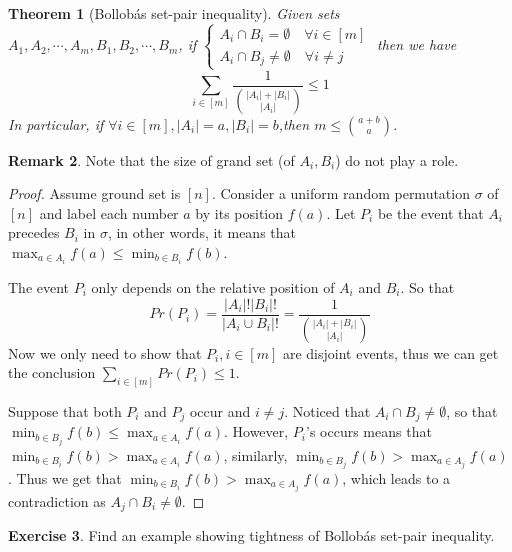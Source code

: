 \documentclass{article}
\newtheorem{theorem}{Theorem}[section]
\theoremstyle{definition}
\newtheorem{remark}[theorem]{Remark}
\newtheorem{exercise}[theorem]{Exercise}
\begin{document}
\begin{theorem}[Bollob\'as set-pair inequality\cite{Bollobassetpair}]
    Given sets $A_1,A_2,\cdots,A_m,B_1,B_2,\cdots,B_m$, if $\left\{\begin{matrix} A_i\cap B_i =\emptyset \quad \forall i\in \left [ m \right ] 
 \\A_i \cap B_j \neq \emptyset \quad \forall i \neq j

\end{matrix}\right.$
then we have $$\sum _{i\in \left [ m \right ] }\frac{1}{\binom{\left | A_i \right |+\left | B_i \right |  }{\left | A_i \right | } } \le 1$$
In particular, if $\forall i \in \left [ m \right ], \left | A_i \right |=a,\left | B_i \right |=b$,then $m \le \binom{a+b}{a}$. 
\end{theorem}

\begin{remark}
    Note that the size of grand set (of $A_i,B_i$) do not play a role.
\end{remark}

\begin{proof}
    Assume ground set is $\left [ n \right ]$. Consider a uniform random permutation $\sigma$ of $\left [ n \right ]$ and label each number $a$ by its position $f(a)$. Let $P_i$ be the event that $A_i$ precedes $B_i$ in $\sigma$, in other words, it means that $\max_{a \in A_i} f(a) \le \min_{b \in B_i} f(b) $. 

    The event $P_i$ only depends on the relative position of $A_i$ and $B_i$. So that $$Pr(P_i)=\frac{\left | A_i \right |!   \left | B_i \right |!  }{\left | A_i \cup B_i \right |! }
=\frac{1}{\binom{\left | A_i \right |+ \left | B_i \right |}{\left | A_i \right |} } $$
    Now we only need to show that $P_i,i\in \left [ m \right ]$ are disjoint events, thus we can get the conclusion $\sum_{i\in \left [ m \right ]}Pr(P_i) \le 1$.

    Suppose that both $P_i$ and $P_j$ occur and $i \neq j$. Noticed that $A_i \cap B_j \neq \emptyset$, so that $\min_{b\in B_j}f(b) \le \max_{a\in A_i}f(a)$. However, $P_i$'s occurs means that $\min_{b\in B_i}f(b) > \max_{a\in A_i}f(a)$, similarly, $\min_{b\in B_j}f(b) > \max_{a\in A_j}f(a)$. Thus we get that $\min_{b\in B_i}f(b) > \max_{a\in A_j}f(a)$, which leads to a contradiction as $A_j \cap B_i \neq \emptyset$.
\end{proof}

\begin{exercise}
    Find an example showing tightness of Bollob\'as set-pair inequality.
\end{exercise}
\end{document}
